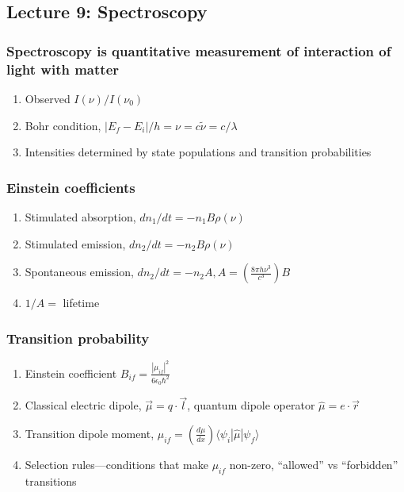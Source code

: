 \documentclass[11pt]{article}
\begin{document}
\subsection{Lecture 9: Spectroscopy}
\label{sec:orgc8b2317}
\subsubsection{Spectroscopy is quantitative measurement of interaction of light with matter}
\label{sec:orgf772074}
\begin{enumerate}
\item Observed \(I(\nu)/I(\nu_0)\)
\item Bohr condition, \(|E_f-E_i|/h=\nu =c\tilde{\nu}=c/\lambda\)
\item Intensities determined by state populations and transition probabilities
\end{enumerate}
\subsubsection{Einstein coefficients}
\label{sec:org3a532c0}
\begin{enumerate}
\item Stimulated absorption, \(dn_1/dt= -n_1 B\rho(\nu)\)
\item Stimulated emission, \(dn_2/dt= -n_2 B\rho(\nu)\)
\item Spontaneous emission, \(dn_2/dt=-n_2 A, A=\left ( \frac{8\pi h
              \nu^3}{c^3}\right )B\)
\item \(1/A=\) lifetime
\end{enumerate}
\subsubsection{Transition probability}
\label{sec:orge7868ae}
\begin{enumerate}
\item Einstein coefficient \(B_{if}=\frac{|\mu_{if}|^2}{6\epsilon_0\hbar^2}\)
\item Classical electric dipole, \(\overrightarrow{\mu}=q \cdot
          \overrightarrow{l}\), quantum dipole operator \(\hat\mu = e\cdot \overrightarrow{r}\)
\item Transition dipole moment, \(\mu_{if} = \left(
        \frac{d\mu}{dx}\right ) \langle \psi_i|\hat\mu |\psi_f \rangle\)
\item Selection rules---conditions that make \(\mu_{if}\) non-zero,
``allowed'' vs ``forbidden'' transitions
\end{enumerate}
\end{document}
